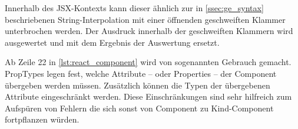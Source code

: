 Innerhalb des JSX-Kontexts kann dieser ähnlich zur in \cref{ssec:ge_syntax}
beschriebenen String-Interpolation mit einer öffnenden geschweiften Klammer
unterbrochen werden.  Der Ausdruck innerhalb der geschweiften Klammern wird
ausgewertet und mit dem Ergebnis der Auswertung ersetzt.

Ab Zeile 22 in \cref{lst:react_component} wird von sogenannten
 Gebrauch gemacht.  PropTypes legen fest, welche
Attribute -- oder Properties -- der Component übergeben werden müssen.
Zusätzlich können die Typen der übergebenen Attribute eingeschränkt werden.
Diese Einschränkungen sind sehr hilfreich zum Aufspüren von Fehlern die sich
sonst von Component zu Kind-Component fortpflanzen würden.
